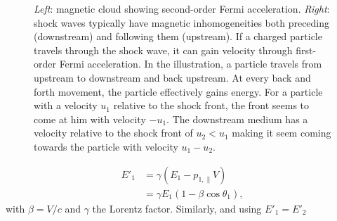 \begin{figure}[t]
\begin{minipage}{6in}
  \centering
  \hspace*{.1in}
\end{minipage}
\caption{\textit{Left}: magnetic cloud showing second-order Fermi acceleration. \textit{Right}: shock waves typically have magnetic inhomogeneities both preceding (downstream) and following them (upstream). If a charged particle travels through the shock wave, it can gain velocity through first-order Fermi acceleration. In the illustration, a particle travels from upstream to downstream and back upstream. At every back and forth movement, the particle effectively gains energy. For a particle with a velocity $u_1$ relative to the shock front, the front seems to come at him with velocity $-u_1$. The downstream medium has a velocity relative to the shock front of $u_2 < u_1$ making it seem coming towards the particle with velocity $u_1-u_2$.}
%
\label{fig:cloud}
\end{figure}

\begin{equation}
\begin{split}
E'_1 &= \gamma \left(E_1 - p_{1,\parallel} V\right) \\
&= \gamma E_1 \left(1-\beta \cos \theta_1\right),
\end{split}
\end{equation}
with $\beta = V/c$ and $\gamma$ the Lorentz factor. Similarly, and using $E'_1 = E'_2$

